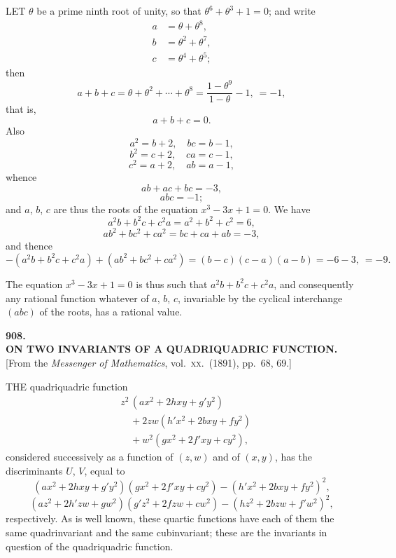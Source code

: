 \documentclass[11pt,a4paper]{article}
\begin{document}
\noindent LET $\theta$ be a prime ninth root of unity, so that $\theta^6 + \theta^3 + 1 = 0$; and write
\begin{align*}
a &= \theta + \theta^8,\\
b &= \theta^2 + \theta^7,\\
c &= \theta^4 + \theta^5;
\end{align*}
then
\[
a + b + c = \theta + \theta^2 + \cdots + \theta^8 = \frac{1 - \theta^9}{1 - \theta} - 1,\ = - 1,
\]
that is,
\[
a + b + c = 0.
\]
Also
\[
a^2 = b + 2,\quad bc = b - 1,
\]
\[
b^2 = c + 2,\quad ca = c - 1,
\]
\[
c^2 = a + 2,\quad ab = a - 1,
\]
whence
\[
ab + ac + bc = - 3,
\]
\[
abc = - 1;
\]
and $a$, $b$, $c$ are thus the roots of the equation $x^3 - 3 x + 1 = 0$. We have
\[
a^2 b + b^2 c + c^2 a = a^2 + b^2 + c^2 = 6,
\]
\[
a b^2 + b c^2 + c a^2 = bc + ca + ab = - 3,
\]
and thence
\[
- (a^2 b + b^2 c + c^2 a) + (a b^2 + b c^2 + c a^2) = (b - c)(c - a)(a - b) = - 6 - 3,\ = - 9.
\]

The equation $x^3 - 3 x + 1 = 0$ is thus such that $a^2 b + b^2 c + c^2 a$, and consequently any rational function whatever of $a$, $b$, $c$, invariable by the cyclical interchange $(abc)$ of the roots, has a rational value.

\clearpage

\begin{center}
{\large\bfseries 908.}\\[0.5em]
{\large\bfseries ON TWO INVARIANTS OF A QUADRIQUADRIC FUNCTION.}\\[0.5em]
\small [From the \emph{Messenger of Mathematics}, vol.\ \textsc{xx}.\ (1891), pp.\ 68, 69.]
\end{center}
\medskip

\noindent THE quadriquadric function
\begin{align*}
& z^2 \,(a x^2 + 2 h x y + g' y^2)\\
& \quad + 2 z w (h' x^2 + 2 b x y + f y^2)\\
& \quad + w^2 (g x^2 + 2 f' x y + c y^2),
\end{align*}
considered successively as a function of $(z, w)$ and of $(x, y)$, has the discriminants $U$, $V$, equal to
\[
(a x^2 + 2 h x y + g' y^2)(g x^2 + 2 f' x y + c y^2) - (h' x^2 + 2 b x y + f y^2)^2,
\]
\[
(a z^2 + 2 h' z w + g w^2)(g' z^2 + 2 f z w + c w^2) - (h z^2 + 2 b z w + f' w^2)^2,
\]
respectively. As is well known, these quartic functions have each of them the same quadrinvariant and the same cubinvariant; these are the invariants in question of the quadriquadric function.
\end{document}
